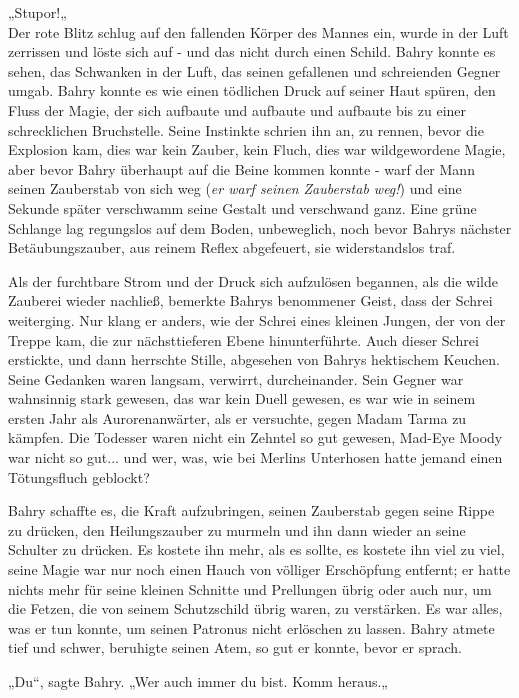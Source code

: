 {„Stupor!„\\ Der rote Blitz schlug auf den fallenden Körper des Mannes ein, wurde in der Luft zerrissen und löste sich auf - und das nicht durch einen Schild. Bahry konnte es sehen, das Schwanken in der Luft, das seinen gefallenen und schreienden Gegner umgab. Bahry konnte es wie einen tödlichen Druck auf seiner Haut spüren, den Fluss der Magie, der sich aufbaute und aufbaute und aufbaute bis zu einer schrecklichen Bruchstelle. Seine Instinkte schrien ihn an, zu rennen, bevor die Explosion kam, dies war kein Zauber, kein Fluch, dies war wildgewordene Magie, aber bevor Bahry überhaupt auf die Beine kommen konnte - warf der Mann seinen Zauberstab von sich weg (\emph{er warf seinen Zauberstab weg!}) und eine Sekunde später verschwamm seine Gestalt und verschwand ganz. Eine grüne Schlange lag regungslos auf dem Boden, unbeweglich, noch bevor Bahrys nächster Betäubungszauber, aus reinem Reflex abgefeuert, sie widerstandslos traf.

Als der furchtbare Strom und der Druck sich aufzulösen begannen, als die wilde Zauberei wieder nachließ, bemerkte Bahrys benommener Geist, dass der Schrei weiterging. Nur klang er anders, wie der Schrei eines kleinen Jungen, der von der Treppe kam, die zur nächsttieferen Ebene hinunterführte. Auch dieser Schrei erstickte, und dann herrschte Stille, abgesehen von Bahrys hektischem Keuchen. Seine Gedanken waren langsam, verwirrt, durcheinander. Sein Gegner war wahnsinnig stark gewesen, das war kein Duell gewesen, es war wie in seinem ersten Jahr als Aurorenanwärter, als er versuchte, gegen Madam Tarma zu kämpfen. Die Todesser waren nicht ein Zehntel so gut gewesen, Mad-Eye Moody war nicht so gut... und wer, was, wie bei Merlins Unterhosen hatte jemand einen Tötungsfluch geblockt?

Bahry schaffte es, die Kraft aufzubringen, seinen Zauberstab gegen seine Rippe zu drücken, den Heilungszauber zu murmeln und ihn dann wieder an seine Schulter zu drücken. Es kostete ihn mehr, als es sollte, es kostete ihn viel zu viel, seine Magie war nur noch einen Hauch von völliger Erschöpfung entfernt; er hatte nichts mehr für seine kleinen Schnitte und Prellungen übrig oder auch nur, um die Fetzen, die von seinem Schutzschild übrig waren, zu verstärken. Es war alles, was er tun konnte, um seinen Patronus nicht erlöschen zu lassen. Bahry atmete tief und schwer, beruhigte seinen Atem, so gut er konnte, bevor er sprach.

„Du“, sagte Bahry. „Wer auch immer du bist. Komm heraus.„

}
